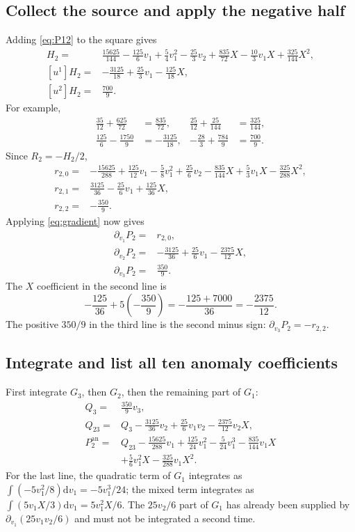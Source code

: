 \documentclass[11pt,a4paper]{article}
\numberwithin{equation}{section}
\newcommand{\dd}{\mathrm d}
\newcommand{\del}{\partial}
\newcommand{\an}{\mathrm{an}}
\begin{document}
\subsection{Collect the source and apply the negative half}
Adding \eqref{eq:P12} to the square gives
\begin{align}
[u^0]H_2={}&\frac{15625}{144}-\frac{125}{6}v_1+\frac54v_1^2
 -\frac{25}{3}v_2+\frac{835}{72}X
 -\frac{10}{3}v_1X+\frac{325}{144}X^2,\\
[u^1]H_2={}&-\frac{3125}{18}+\frac{25}{3}v_1-\frac{125}{18}X,\\
[u^2]H_2={}&\frac{700}{9}.
\end{align}
For example,
\begin{align}
\frac{35}{12}+\frac{625}{72}&=\frac{835}{72},&
\frac{25}{12}+\frac{25}{144}&=\frac{325}{144},\\
\frac{125}{6}-\frac{1750}{9}&=-\frac{3125}{18},&
-\frac{28}{3}+\frac{784}{9}&=\frac{700}{9}.
\end{align}
Since $R_2=-H_2/2$,
\begin{align}
r_{2,0}={}&-\frac{15625}{288}+\frac{125}{12}v_1-\frac58v_1^2
 +\frac{25}{6}v_2-\frac{835}{144}X
 +\frac53v_1X-\frac{325}{288}X^2,\\
r_{2,1}={}&\frac{3125}{36}-\frac{25}{6}v_1+\frac{125}{36}X,\\
r_{2,2}={}&-\frac{350}{9}.
\end{align}
Applying \eqref{eq:gradient} now gives
\begin{align}
\del_{v_1}P_2={}&r_{2,0},\\
\del_{v_2}P_2={}&-\frac{3125}{36}+\frac{25}{6}v_1-\frac{2375}{12}X,\\
\del_{v_3}P_2={}&\frac{350}{9}.
\end{align}
The $X$ coefficient in the second line is
\begin{equation}
-\frac{125}{36}+5\left(-\frac{350}{9}\right)
 =-\frac{125+7000}{36}=-\frac{2375}{12}.
\end{equation}
The positive $350/9$ in the third line is the second minus sign:
$\del_{v_3}P_2=-r_{2,2}$.

\subsection{Integrate and list all ten anomaly coefficients}
First integrate $G_3$, then $G_2$, then the remaining part of $G_1$:
\begin{align}
Q_3={}&\frac{350}{9}v_3,\\
Q_{23}={}&Q_3-\frac{3125}{36}v_2+\frac{25}{6}v_1v_2
                         -\frac{2375}{12}v_2X,\\
P_2^{\an}={}&Q_{23}-\frac{15625}{288}v_1+\frac{125}{24}v_1^2
 -\frac5{24}v_1^3-\frac{835}{144}v_1X\\
 &+\frac56v_1^2X-\frac{325}{288}v_1X^2.
\end{align}
For the last line, the quadratic term of $G_1$ integrates as
$\int(-5v_1^2/8)\dd v_1=-5v_1^3/24$; the mixed term integrates as
$\int(5v_1X/3)\dd v_1=5v_1^2X/6$. The $25v_2/6$ part of $G_1$
has already been supplied by $\del_{v_1}(25v_1v_2/6)$ and must not be
integrated a second time.
\end{document}
